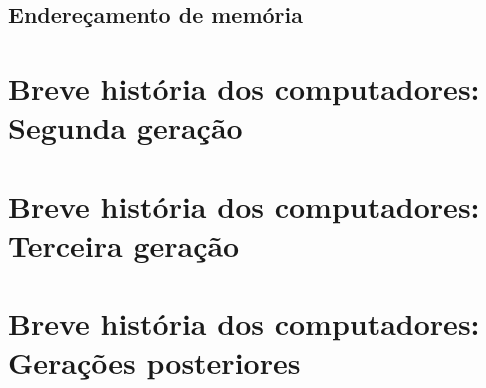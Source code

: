 \documentclass{article}
\begin{document}
		\subsection{Endereçamento de memória}
	\section{Breve história dos computadores: Segunda geração}
	\section{Breve história dos computadores: Terceira geração}
	\section{Breve história dos computadores: Gerações posteriores}
\end{document}

